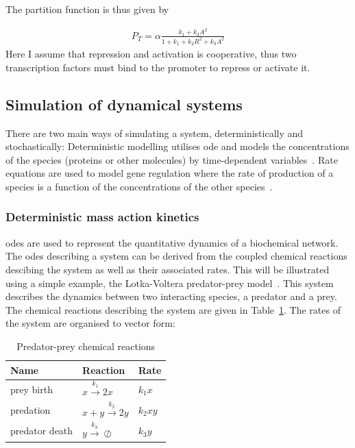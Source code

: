 The partition function is thus given by 

\begin{align}
	P_{T} = \alpha \frac{k_1 + k_{3}A^2}{1 + k_1 + k_{2}R^2 + k_{3}A^2}
\end{align}
Here I assume that repression and activation is cooperative, thus two transcription factors must bind to the promoter to repress or activate it. 
\newpage
\subsection{Simulation of dynamical systems}

There are two main ways of simulating a system, deterministically and stochastically: Deterministic modelling utilises \acrshort{ode} and models the concentrations of the species (proteins or other molecules) by time-dependent variables~\autocite{deJong:2002ft}. Rate equations are used to model gene regulation where the rate of production of a species is a function of the concentrations of the other species~\autocite{deJong:2002ft}. 

\subsubsection{Deterministic mass action kinetics}
\label{sec:predator_prey_odes}
\acrshort{ode}s are used to represent the quantitative dynamics of a biochemical network. The \acrshort{ode}s describing a system can be derived from the coupled chemical reactions descibing the system as well as their associated rates. This will be illustrated using a simple example, the Lotka-Voltera predator-prey model~\autocite{lotka:voltera}. This system describes the dynamics between two interacting species, a predator and a prey. The chemical reactions describing the system are given in Table~\ref{tab:pp_reac}. The rates of the system are organised to vector form:


\begin{table}[h]
\centering
\caption{Predator-prey chemical reactions}
\label{tab:pp_reac}
\begin{tabular}{@{}lll@{}}
\toprule
Name & Reaction & Rate \\ \midrule
prey birth & $x \xrightarrow{k_1} 2x$ & $k_{1}x$ \\
predation & $x + y \xrightarrow{k_2} 2y$ & $k_{2}xy$ \\
predator death & $y \xrightarrow{k_3} \oslash$ & $k_{3}y$ \\ \bottomrule
\end{tabular}
\end{table}

